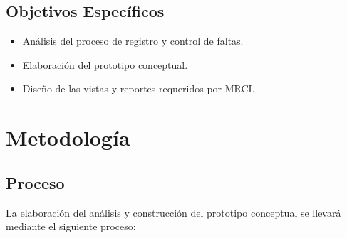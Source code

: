 \documentclass[10pt]{book}
\newcommand{\cliente}{MRCI}
\begin{document}
\section{Objetivos Específicos}

\begin{itemize}
	\item Análisis del proceso de registro y control de faltas.
	\item Elaboración del prototipo conceptual.
	\item Diseño de las vistas y reportes requeridos por \cliente.
\end{itemize}

%
%
%
%

	
	
\chapter{Metodología}


\section{Proceso}

	La elaboración del análisis y construcción del prototipo conceptual se llevará mediante el siguiente proceso:
	
\end{document}
